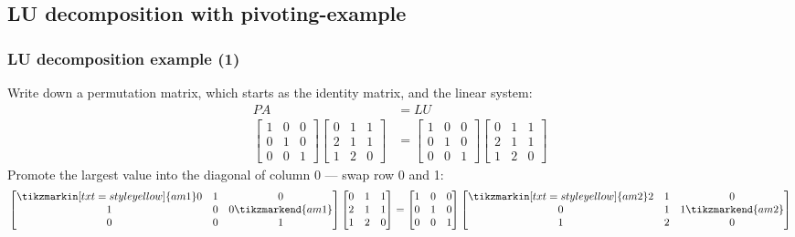 \subsection*{LU decomposition with pivoting-example}
\begin{frame}[fragile]
  \frametitle{LU decomposition example (1)}
  Write down a permutation matrix, which starts as the identity matrix, and the linear system:
  \begin{align*}
    PA &= LU \\
    \begin{bmatrix}
      1 & 0 & 0\\
      0 & 1 & 0\\
      0 & 0 & 1
    \end{bmatrix} 
    \begin{bmatrix}
      0 & 1 & 1\\
      2 & 1 & 1\\
      1 & 2 & 0
      \end{bmatrix}&= 
      \begin{bmatrix}
      1 & 0 & 0\\
      0 & 1 & 0\\
      0 & 0 & 1
      \end{bmatrix}
      \begin{bmatrix}
      0 & 1 & 1\\
      2 & 1 & 1\\
      1 & 2 & 0
      \end{bmatrix}
  \end{align*}
  \pause
  Promote the largest value into the diagonal of column 0 --- swap row 0 and 1:
    \[
      \begin{bmatrix}
	\tikzmarkin[txt=style yellow]{am1} 0 & 1 & 0\\
	1 & 0 & 0 \tikzmarkend{am1}\\
	0 & 0 & 1
      \end{bmatrix} 
      \begin{bmatrix}
	0 & 1 & 1\\
	2 & 1 & 1\\
	1 & 2 & 0
      \end{bmatrix}= 
      \begin{bmatrix}
	1 & 0 & 0\\
	0 & 1 & 0\\
	0 & 0 & 1
      \end{bmatrix}
      \begin{bmatrix}
	\tikzmarkin[txt=style yellow]{am2}2 & 1 & 0\\
	0 & 1 & 1 \tikzmarkend{am2}\\
	1 & 2 & 0
      \end{bmatrix}
    \]
\end{frame}
